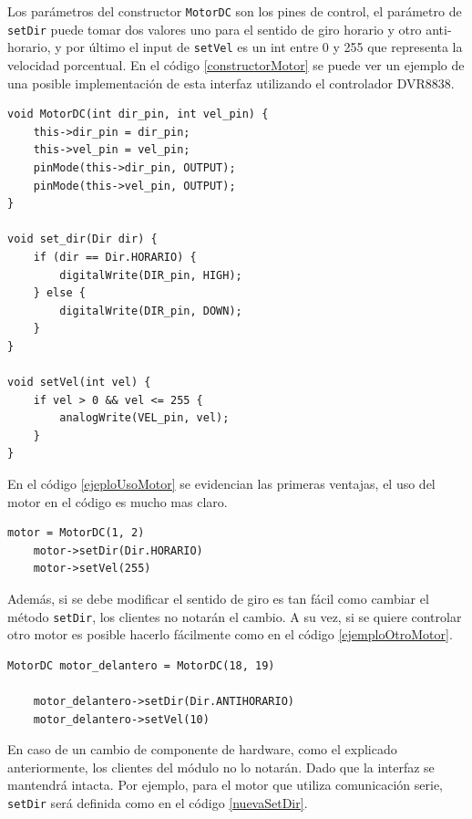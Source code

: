 Los parámetros del constructor \verb|MotorDC| son los pines de control, el parámetro de \verb|setDir| puede tomar dos valores uno para el sentido de giro horario y otro anti-horario, y por último el input de \verb|setVel| es un int entre 0 y 255 que representa la velocidad porcentual. En el código \ref{constructorMotor} se puede ver un ejemplo de una posible implementación de esta interfaz utilizando el controlador \gls{DVR8838}.

\begin{lstlisting}[caption=Posible implementación de la interfaz del módulo MotorDC.,label={constructorMotor}]
void MotorDC(int dir_pin, int vel_pin) {
    this->dir_pin = dir_pin;
    this->vel_pin = vel_pin;
    pinMode(this->dir_pin, OUTPUT);
    pinMode(this->vel_pin, OUTPUT);
}

void set_dir(Dir dir) {
    if (dir == Dir.HORARIO) {
        digitalWrite(DIR_pin, HIGH);
    } else {
        digitalWrite(DIR_pin, DOWN);
    }
}

void setVel(int vel) {
    if vel > 0 && vel <= 255 {
        analogWrite(VEL_pin, vel);
    }
}
\end{lstlisting}

En el código \ref{ejeploUsoMotor} se evidencian las primeras ventajas, el uso del motor en el código es mucho mas claro.

\begin{lstlisting}[caption=Ejmplo de uso de la interfaz del módulo MotorDC, label={ejeploUsoMotor}]
	motor = MotorDC(1, 2)
    motor->setDir(Dir.HORARIO)
    motor->setVel(255)
\end{lstlisting}

Además, si se debe modificar el sentido de giro es tan fácil como cambiar el método \verb|setDir|, los clientes no notarán el cambio. A su vez, si se quiere controlar otro motor es posible hacerlo fácilmente como en el código \ref{ejemploOtroMotor}. 

\begin{lstlisting}[caption=Ejemplo control motor paso a paso comunicación serie.,label={ejemploOtroMotor}]
    MotorDC motor_delantero = MotorDC(18, 19)

    motor_delantero->setDir(Dir.ANTIHORARIO)
    motor_delantero->setVel(10)
\end{lstlisting}

En caso de un cambio de componente de hardware, como el explicado anteriormente, los clientes del módulo no lo notarán. Dado que la interfaz se mantendrá intacta. Por ejemplo, para el motor que utiliza comunicación serie, \verb|setDir| será definida como en el código \ref{nuevaSetDir}.

